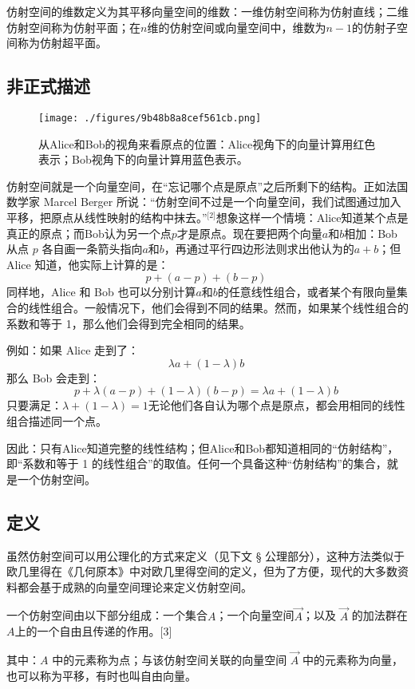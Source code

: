仿射空间的维数定义为其平移向量空间的维数：一维仿射空间称为仿射直线；二维仿射空间称为仿射平面；在$n$维的仿射空间或向量空间中，维数为$n-1$的仿射子空间称为仿射超平面。
\subsection{非正式描述}
\begin{figure}[ht]
\centering
\texttt{[image: ./figures/9b48b8a8cef561cb.png]}
\caption{从Alice和Bob的视角来看原点的位置：Alice视角下的向量计算用红色表示；Bob视角下的向量计算用蓝色表示。} \label{fig_FSKJ_2}
\end{figure}
仿射空间就是一个向量空间，在“忘记哪个点是原点”之后所剩下的结构。正如法国数学家 Marcel Berger 所说：“仿射空间不过是一个向量空间，我们试图通过加入平移，把原点从线性映射的结构中抹去。”\(^\text{[2]}\)想象这样一个情境：Alice知道某个点是真正的原点；而Bob认为另一个点$p$才是原点。现在要把两个向量$a$和$b$相加：Bob 从点 $p$ 各自画一条箭头指向$a$和$b$，再通过平行四边形法则求出他认为的$a + b$；但 Alice 知道，他实际上计算的是：
$$
p + (a - p) + (b - p)~
$$
同样地，Alice 和 Bob 也可以分别计算$a$和$b$的任意线性组合，或者某个有限向量集合的线性组合。一般情况下，他们会得到不同的结果。然而，如果某个线性组合的系数和等于 1，那么他们会得到完全相同的结果。

例如：如果 Alice 走到了：
$$
\lambda a + (1 - \lambda)b~
$$
那么 Bob 会走到：
$$
p + \lambda(a - p) + (1 - \lambda)(b - p) = \lambda a + (1 - \lambda)b~
$$
只要满足：$\lambda + (1 - \lambda) = 1$无论他们各自认为哪个点是原点，都会用相同的线性组合描述同一个点。

因此：只有Alice知道完整的线性结构；但Alice和Bob都知道相同的“仿射结构”，即“系数和等于 1 的线性组合”的取值。任何一个具备这种“仿射结构”的集合，就是一个仿射空间。
\subsection{定义}
虽然仿射空间可以用公理化的方式来定义（见下文 § 公理部分），这种方法类似于欧几里得在《几何原本》中对欧几里得空间的定义，但为了方便，现代的大多数资料都会基于成熟的向量空间理论来定义仿射空间。

一个仿射空间由以下部分组成：一个集合$A$；一个向量空间$\overrightarrow{A}$；以及 $\overrightarrow{A}$ 的加法群在$A$上的一个自由且传递的作用。[3]

其中：$A$ 中的元素称为点；与该仿射空间关联的向量空间 $\overrightarrow{A}$ 中的元素称为向量，也可以称为平移，有时也叫自由向量。

